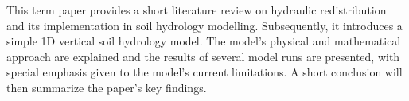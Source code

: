 This term paper provides a short literature review on hydraulic redistribution and its implementation in soil hydrology modelling.
Subsequently, it introduces a simple 1D vertical soil hydrology model.
The model’s physical and mathematical approach are explained and the results of several model runs are presented, with special emphasis given to the model’s current limitations.
A short conclusion will then summarize the paper’s key findings.


